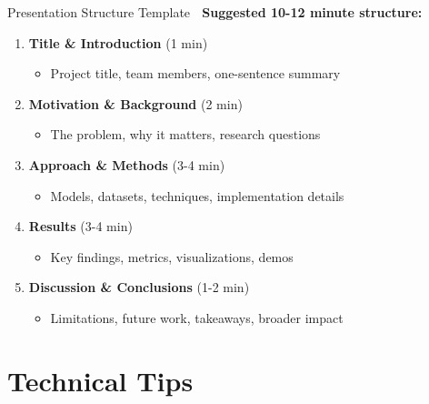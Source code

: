 \documentclass[aspectratio=169]{beamer}
\begin{document}
\begin{frame}[shrink=10]{Presentation Structure Template 📝}
\textbf{Suggested 10-12 minute structure:}

\begin{enumerate}\setlength{\itemsep}{0pt}
    \item \textbf{Title \& Introduction} (1 min)
    \begin{itemize}\setlength{\itemsep}{0pt}
        \item Project title, team members, one-sentence summary
    \end{itemize}

    \item \textbf{Motivation \& Background} (2 min)
    \begin{itemize}\setlength{\itemsep}{0pt}
        \item The problem, why it matters, research questions
    \end{itemize}

    \item \textbf{Approach \& Methods} (3-4 min)
    \begin{itemize}\setlength{\itemsep}{0pt}
        \item Models, datasets, techniques, implementation details
    \end{itemize}

    \item \textbf{Results} (3-4 min)
    \begin{itemize}\setlength{\itemsep}{0pt}
        \item Key findings, metrics, visualizations, demos
    \end{itemize}

    \item \textbf{Discussion \& Conclusions} (1-2 min)
    \begin{itemize}\setlength{\itemsep}{0pt}
        \item Limitations, future work, takeaways, broader impact
    \end{itemize}
\end{enumerate}
\end{frame}

\section{Technical Tips}
\end{document}
